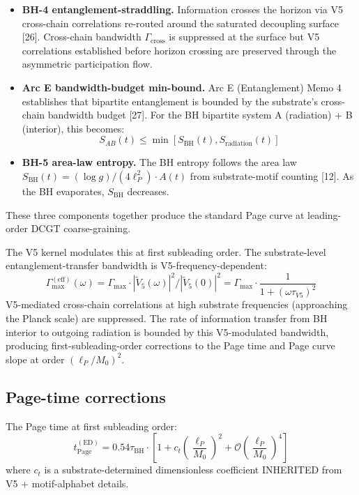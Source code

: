 \documentclass[11pt,a4paper]{article}
\begin{document}
\begin{itemize}[noitemsep]
\item \textbf{BH-4 entanglement-straddling.} Information crosses the horizon via V5 cross-chain correlations re-routed around the saturated decoupling surface [26]. Cross-chain bandwidth $\Gamma_\mathrm{cross}$ is suppressed at the surface but V5 correlations established before horizon crossing are preserved through the asymmetric participation flow.
\item \textbf{Arc E bandwidth-budget min-bound.} Arc E (Entanglement) Memo 4 establishes that bipartite entanglement is bounded by the substrate's cross-chain bandwidth budget [27]. For the BH bipartite system A (radiation) + B (interior), this becomes:
\[
S_{AB}(t) \leq \min[S_\mathrm{BH}(t), S_\mathrm{radiation}(t)]
\]
\item \textbf{BH-5 area-law entropy.} The BH entropy follows the area law $S_\mathrm{BH}(t) = (\log g)/(4\ell_P^{2}) \cdot A(t)$ from substrate-motif counting [12]. As the BH evaporates, $S_\mathrm{BH}$ decreases.
\end{itemize}

These three components together produce the standard Page curve at leading-order DCGT coarse-graining.

The V5 kernel modulates this at first subleading order. The substrate-level entanglement-transfer bandwidth is V5-frequency-dependent:
\[
\Gamma_\mathrm{max}^{(\mathrm{eff})}(\omega) = \Gamma_\mathrm{max} \cdot |\tilde V_5(\omega)|^{2} / |\tilde V_5(0)|^{2} = \Gamma_\mathrm{max} \cdot \frac{1}{1 + (\omega\tau_{V5})^{2}}
\]
V5-mediated cross-chain correlations at high substrate frequencies (approaching the Planck scale) are suppressed. The rate of information transfer from BH interior to outgoing radiation is bounded by this V5-modulated bandwidth, producing first-subleading-order corrections to the Page time and Page curve slope at order $(\ell_P/M_0)^{2}$.

\subsection{Page-time corrections}

The Page time at first subleading order:
\[
t_\mathrm{Page}^{(\mathrm{ED})} = 0.54 \tau_\mathrm{BH} \cdot \left[1 + c_t \left(\frac{\ell_P}{M_0}\right)^{2} + \mathcal{O}\left(\frac{\ell_P}{M_0}\right)^{4}\right]
\]
where $c_t$ is a substrate-determined dimensionless coefficient INHERITED from V5 + motif-alphabet details.
\end{document}
